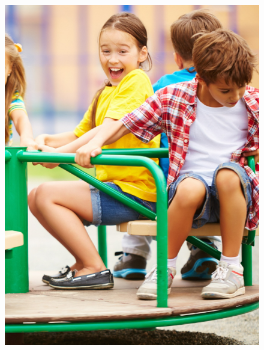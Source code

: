\begin{figure}[htpb]
\vspace*{-2.5cm}
\hspace{-3cm}\includegraphics[height=\paperheight]{../separadores/separadorCHU5B.png}
\end{figure}

\setcounter{chapter}{0}


\setcounter{chapter}{0}





%


\blankpage

